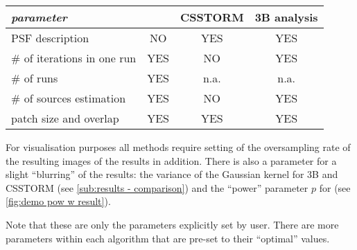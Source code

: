 \begin{table}[!h]
\centering
	\begin{tabular}{|l||c|c|c|}
		\hline
		{\it parameter}				& {\bf\inmf} & {\bf CSSTORM} & {\bf 3B analysis}\\ \hline
		
		PSF description		& NO  	& YES	& YES \\ \hline
		\# of iterations in one run	& YES	& NO 	& YES \\ \hline
		\# of runs				& YES	& n.a. 	& n.a.   \\ \hline	
		\# of sources estimation	& YES	& NO	& YES \\ \hline
		patch size and overlap	& YES 	& YES	& YES \\ \hline
	\end{tabular}
\end{table}

For visualisation purposes all methods require setting of the oversampling rate of the resulting images of the results in addition. There is also a parameter for a slight ``blurring'' of the results: the variance of the Gaussian kernel for 3B and CSSTORM  (see \autoref{sub:results - comparison}) and the ``power'' parameter $p$ for \inmf{} (see \autoref{fig:demo pow w result}).

Note that these are only the parameters explicitly set by user. There are more parameters within each algorithm that are pre-set to their ``optimal'' values. 


\clearpage
